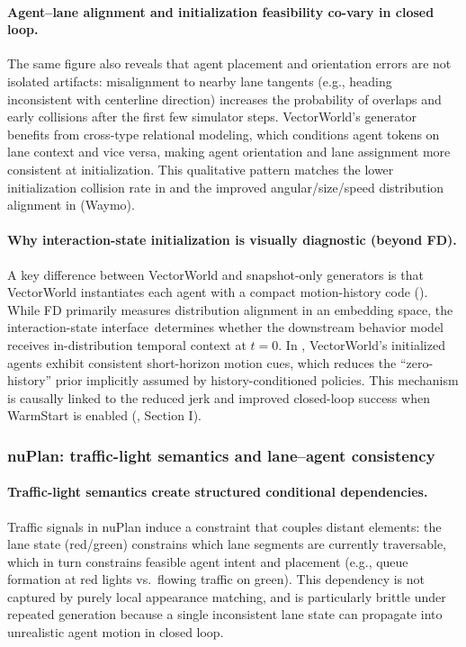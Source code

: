 \documentclass{article}
\newcommand{\InteractionState}{interaction-state interface}
\theoremstyle{plain}
\theoremstyle{definition}
\theoremstyle{remark}
\begin{document}
\paragraph{Agent--lane alignment and initialization feasibility co-vary in closed loop.}
The same figure also reveals that agent placement and orientation errors are not isolated artifacts: misalignment to nearby lane tangents
(e.g., heading inconsistent with centerline direction) increases the probability of overlaps and early collisions after the first few simulator steps.
VectorWorld’s generator benefits from cross-type relational modeling, which conditions agent tokens on lane context and vice versa,
making agent orientation and lane assignment more consistent at initialization.
This qualitative pattern matches the lower initialization collision rate in  and the improved angular/size/speed
distribution alignment in  (Waymo).

\paragraph{Why interaction-state initialization is visually diagnostic (beyond FD).}
A key difference between VectorWorld and snapshot-only generators is that VectorWorld instantiates each agent with a compact motion-history code
().
While FD primarily measures distribution alignment in an embedding space, the \InteractionState\ determines whether the downstream
behavior model receives in-distribution temporal context at \(t=0\).
In , VectorWorld’s initialized agents exhibit consistent short-horizon motion cues, which reduces the “zero-history” prior
implicitly assumed by history-conditioned policies.
This mechanism is causally linked to the reduced jerk and improved closed-loop success when WarmStart is enabled
(, Section I).

\subsubsection{nuPlan: traffic-light semantics and lane--agent consistency}
\label{app:vis:nuplan}

\paragraph{Traffic-light semantics create structured conditional dependencies.}
Traffic signals in nuPlan induce a constraint that couples distant elements:
the lane state (red/green) constrains which lane segments are currently traversable, which in turn constrains feasible agent intent and placement
(e.g., queue formation at red lights vs.\ flowing traffic on green).
This dependency is not captured by purely local appearance matching, and is particularly brittle under repeated generation because
a single inconsistent lane state can propagate into unrealistic agent motion in closed loop.
\end{document}
